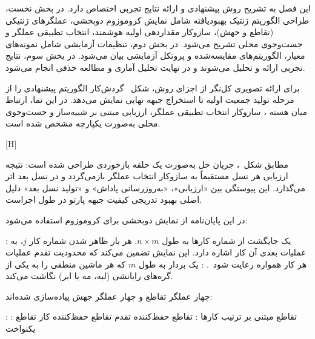 
این فصل به تشریح روش پیشنهادی و ارائه نتایج تجربی اختصاص دارد.
در بخش نخست، طراحی الگوریتم ژنتیک بهبودیافته شامل
نمایش کروموزوم دوبخشی، عملگرهای ژنتیکی (تقاطع و جهش)،
سازوکار مقداردهی اولیه هوشمند، انتخاب تطبیقی عملگر
و جست‌وجوی محلی تشریح می‌شود.
در بخش دوم، تنظیمات آزمایشی شامل نمونه‌های معیار،
الگوریتم‌های مقایسه‌شده و پروتکل آزمایشی بیان می‌شود.
در بخش سوم، نتایج تجربی ارائه و تحلیل می‌شوند
و در نهایت تحلیل آماری و مطالعه حذفی انجام می‌شود.



برای ارائه تصویری کل‌نگر از اجزای روش، شکل~
گردش‌کار الگوریتم پیشنهادی را از مرحله تولید جمعیت اولیه تا استخراج جبهه نهایی
نمایش می‌دهد.
در این نما، ارتباط میان هسته ، سازوکار انتخاب تطبیقی عملگر،
ارزیابی مبتنی بر شبیه‌ساز و جست‌وجوی محلی به‌صورت یکپارچه مشخص شده است.

[H]

مطابق شکل~، جریان حل به‌صورت یک حلقه بازخوردی طراحی شده است:
نتیجه ارزیابی هر نسل مستقیماً به سازوکار انتخاب عملگر بازمی‌گردد و در نسل بعد اثر می‌گذارد.
این پیوستگی بین «ارزیابی»، «به‌روزرسانی پاداش» و «تولید نسل بعد» دلیل اصلی بهبود تدریجی کیفیت جبهه پارتو در طول اجراست.



در این پایان‌نامه از نمایش دوبخشی برای کروموزوم استفاده می‌شود:

 :
یک جایگشت از شماره کارها به طول $n \times m$.
هر بار ظاهر شدن شماره کار $j$، به عملیات بعدی آن کار اشاره دارد.
این نمایش تضمین می‌کند که محدودیت تقدم عملیات هر کار همواره رعایت شود~\cite{bierwirth1995generalized}.
 :
یک بردار به طول $m$ که هر ماشین منطقی را به یکی از گره‌های رایانشی
(لبه، مه یا ابر) نگاشت می‌کند.



چهار عملگر تقاطع و چهار عملگر جهش
پیاده‌سازی شده‌اند:

:
 : تقاطع مبتنی بر ترتیب کارها
 : تقاطع حفظ‌کننده تقدم
 تقاطع حفظ‌کننده کار
 تقاطع یکنواخت

